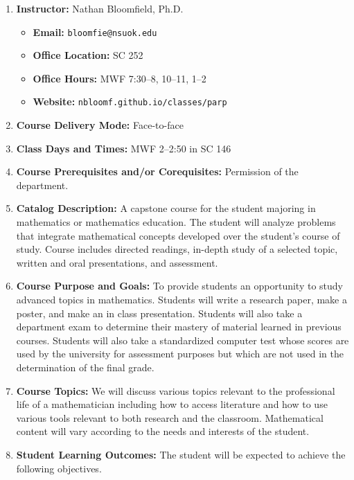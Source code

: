 \documentclass{article}
\begin{document}
\begin{enumerate}
\item \textbf{Instructor:} Nathan Bloomfield, Ph.D.
\begin{itemize}
\item \textbf{Email:} \texttt{bloomfie@nsuok.edu}
\item \textbf{Office Location:} SC 252 
\item \textbf{Office Hours:} MWF 7:30--8, 10--11, 1--2
\item \textbf{Website:} \texttt{nbloomf.github.io/classes/parp}
\end{itemize}


\item \textbf{Course Delivery Mode:} Face-to-face


\item \textbf{Class Days and Times:} MWF 2--2:50 in SC 146


\item \textbf{Course Prerequisites and/or Corequisites:} Permission of the department.


\item \textbf{Catalog Description:} A capstone course for the student majoring in mathematics or mathematics education. The student will analyze problems that integrate mathematical concepts developed over the student’s course of study. Course includes directed readings, in-depth study of a selected topic, written and oral presentations, and assessment.


\item \textbf{Course Purpose and Goals:} To provide students an opportunity to study advanced topics in mathematics. Students will write a research paper, make a poster, and make an in class presentation. Students will also take a department exam to determine their mastery of material learned in previous courses. Students will also take a standardized computer test whose scores are used by the university for assessment purposes but which are not used in the determination of the final grade.


\item \textbf{Course Topics:} We will discuss various topics relevant to the professional life of a mathematician including how to access literature and how to use various tools relevant to both research and the classroom. Mathematical content will vary according to the needs and interests of the student.


\item \textbf{Student Learning Outcomes:} The student will be expected to achieve the following objectives.



\end{enumerate}
\end{document}
